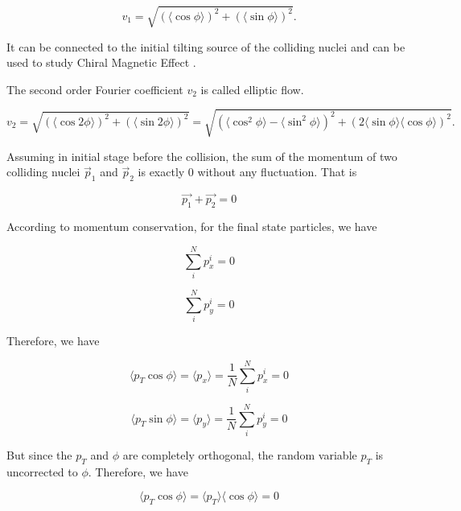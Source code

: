 \begin{equation}
v_1 =  \sqrt{(\langle \cos \phi \rangle)^2+(\langle \sin \phi \rangle)^2}. 
\end{equation}

It can be connected to the initial tilting source of the colliding nuclei \cite{V1Tilted} and can be used to study Chiral Magnetic Effect \cite{V1CME}. 

The second order Fourier coefficient $v_2$ is called elliptic flow. 

\begin{equation}
v_2 =  \sqrt{(\langle \cos 2\phi \rangle)^2+(\langle \sin 2\phi \rangle)^2} =  \sqrt{(\langle \cos^2 \phi \rangle - \langle \sin^2 \phi \rangle)^2 + (2  \langle \sin \phi \rangle \langle \cos \phi \rangle)^2}. 
\end{equation}

Assuming in initial stage before the collision, the sum of the momentum of two colliding nuclei $\vec p_1$ and $\vec p_2$ is exactly 0 without any fluctuation. That is

\begin{equation}
\vec{p_1} + \vec{p_2} = 0
\end{equation}

According to momentum conservation, for the final state particles, we have 

\begin{equation}
\sum_i^N p_x^i = 0
\end{equation}

\begin{equation}
\sum_i^N p_y^i = 0
\end{equation}

Therefore, we have

\begin{equation}
\langle p_T \cos \phi \rangle = \langle p_x \rangle = \frac{1}{N} \sum_i^N p_x^i   = 0
\end{equation}

\begin{equation}
\langle p_T \sin \phi \rangle = \langle p_y \rangle =  \frac{1}{N} \sum_i^N p_y^i  = 0
\end{equation}
 
But since the $p_T$ and $\phi$ are completely orthogonal, the random variable $p_T$ is uncorrected to $\phi$. Therefore, we have 
 
\begin{equation}
\langle p_T \cos \phi \rangle =  \langle p_T \rangle \langle  \cos \phi \rangle = 0
\end{equation}

